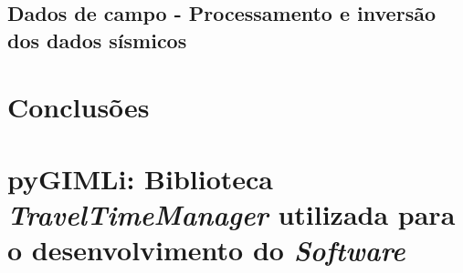 \documentclass[a4paper, 12 pt]{article} %
\begin{document}
\clearpage 


\subsection{Dados de campo - Processamento e inversão dos dados sísmicos}

\blindtext 
%
\blindtext 
%
\blindtext

\clearpage


\section{Conclusões}

\blindtext 
%
\blindtext 
%
\blindtext


\clearpage






\clearpage


\appendix
\section{pyGIMLi: Biblioteca \textit{TravelTimeManager} utilizada para o desenvolvimento do \emph{Software}}
\label{apendice_scr}
\end{document}
